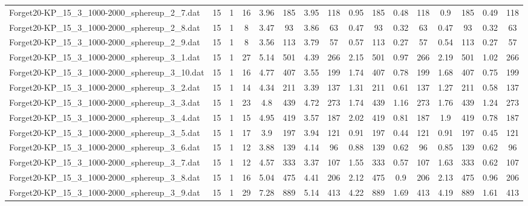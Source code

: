 \begin{sidewaystable}[!ht]
{\begin{tabular}{lccccccccccccccc}
Forget20-KP\_15\_3\_1000-2000\_sphereup\_2\_7.dat & 15 & 1 & 16 & 3.96 & 185 & 3.95 & 118 & 0.95 & 185 &  \textcolor{blue2}{0.48} & 118 & 0.9 & 185 & 0.49 & 118 \\
Forget20-KP\_15\_3\_1000-2000\_sphereup\_2\_8.dat & 15 & 1 & 8 & 3.47 & 93 & 3.86 & 63 & 0.47 & 93 &  \textcolor{blue2}{0.32} & 63 & 0.47 & 93 &  \textcolor{blue2}{0.32} & 63 \\
Forget20-KP\_15\_3\_1000-2000\_sphereup\_2\_9.dat & 15 & 1 & 8 & 3.56 & 113 & 3.79 & 57 & 0.57 & 113 &  \textcolor{blue2}{0.27} & 57 & 0.54 & 113 &  \textcolor{blue2}{0.27} & 57 \\
Forget20-KP\_15\_3\_1000-2000\_sphereup\_3\_1.dat & 15 & 1 & 27 & 5.14 & 501 & 4.39 & 266 & 2.15 & 501 &  \textcolor{blue2}{0.97} & 266 & 2.19 & 501 & 1.02 & 266 \\
Forget20-KP\_15\_3\_1000-2000\_sphereup\_3\_10.dat & 15 & 1 & 16 & 4.77 & 407 & 3.55 & 199 & 1.74 & 407 & 0.78 & 199 & 1.68 & 407 & 0.75 & 199 \\
Forget20-KP\_15\_3\_1000-2000\_sphereup\_3\_2.dat & 15 & 1 & 14 & 4.34 & 211 & 3.39 & 137 & 1.31 & 211 & 0.61 & 137 & 1.27 & 211 &  \textcolor{blue2}{0.58} & 137 \\
Forget20-KP\_15\_3\_1000-2000\_sphereup\_3\_3.dat & 15 & 1 & 23 & 4.8 & 439 & 4.72 & 273 & 1.74 & 439 &  \textcolor{blue2}{1.16} & 273 & 1.76 & 439 & 1.24 & 273 \\
Forget20-KP\_15\_3\_1000-2000\_sphereup\_3\_4.dat & 15 & 1 & 15 & 4.95 & 419 & 3.57 & 187 & 2.02 & 419 & 0.81 & 187 & 1.9 & 419 & 0.78 & 187 \\
Forget20-KP\_15\_3\_1000-2000\_sphereup\_3\_5.dat & 15 & 1 & 17 & 3.9 & 197 & 3.94 & 121 & 0.91 & 197 &  \textcolor{blue2}{0.44} & 121 & 0.91 & 197 & 0.45 & 121 \\
Forget20-KP\_15\_3\_1000-2000\_sphereup\_3\_6.dat & 15 & 1 & 12 & 3.88 & 139 & 4.14 & 96 & 0.88 & 139 &  \textcolor{blue2}{0.62} & 96 & 0.85 & 139 &  \textcolor{blue2}{0.62} & 96 \\
Forget20-KP\_15\_3\_1000-2000\_sphereup\_3\_7.dat & 15 & 1 & 12 & 4.57 & 333 & 3.37 & 107 & 1.55 & 333 &  \textcolor{blue2}{0.57} & 107 & 1.63 & 333 & 0.62 & 107 \\
Forget20-KP\_15\_3\_1000-2000\_sphereup\_3\_8.dat & 15 & 1 & 16 & 5.04 & 475 & 4.41 & 206 & 2.12 & 475 &  \textcolor{blue2}{0.9} & 206 & 2.13 & 475 & 0.96 & 206 \\
Forget20-KP\_15\_3\_1000-2000\_sphereup\_3\_9.dat & 15 & 1 & 29 & 7.28 & 889 & 5.14 & 413 & 4.22 & 889 & 1.69 & 413 & 4.19 & 889 &  \textcolor{blue2}{1.61} & 413 \\

\end{tabular}}
\end{sidewaystable}
